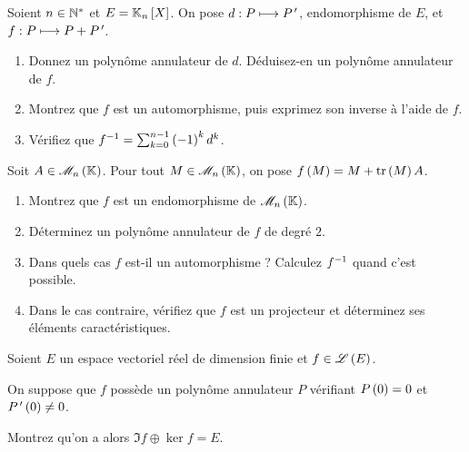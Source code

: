 \begin{corr}
\end{corr}

\begin{exopss}[Exercice 31]
Soient \(n\in\mathbb{N}^*\) et \(E=\polydeg{n}\). On pose \(d:P\longmapsto P^{\,\prime}\), endomorphisme de \(E\), et \(f:P\longmapsto P+P^{\,\prime}\).

\begin{enumerate}
    \item Donnez un polynôme annulateur de \(d\). Déduisez-en un polynôme annulateur de \(f\). \\
    \item Montrez que \(f\) est un automorphisme, puis exprimez son inverse à l'aide de \(f\). \\
    \item Vérifiez que \(f^{-1}=\sum_{k=0}^{n-1}\left(-1\right)^kd^k\).
\end{enumerate}
\end{exopss}

\begin{corr}
\end{corr}

\begin{exopss}[Exercice 32]
Soit \(A\in\M{n}\). Pour tout \(M\in\M{n}\), on pose \(f\left(M\right)=M+\operatorname{tr}\left(M\right)A\).

\begin{enumerate}
    \item Montrez que \(f\) est un endomorphisme de \(\M{n}\). \\
    \item Déterminez un polynôme annulateur de \(f\) de degré \(2\). \\
    \item Dans quels cas \(f\) est-il un automorphisme ? Calculez \(f^{-1}\) quand c'est possible. \\
    \item Dans le cas contraire, vérifiez que \(f\) est un projecteur et déterminez ses éléments caractéristiques.
\end{enumerate}
\end{exopss}

\begin{corr}
\end{corr}

\begin{exopss}[Exercice 33]
Soient \(E\) un espace vectoriel réel de dimension finie et \(f\in\mathscr{L}\left(E\right)\).

On suppose que \(f\) possède un polynôme annulateur \(P\) vérifiant \(P\left(0\right)=0\) et \(P^{\,\prime}\left(0\right)\not=0\).

Montrez qu'on a alors \(\Im f\oplus\ker f=E\).
\end{exopss}

